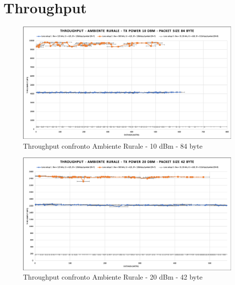 \documentclass[12pt,a4paper,openright,twoside]{report}
\begin{document}
\section{Throughput}
\begin{figure}[h]                      
\begin{center} 
\includegraphics[width=\textwidth]{THROUGHPUT_confronto_AR_10dBm_84byte.png}
\caption[Throughput confronto Ambiente Rurale - 10 dBm - 84 byte]{Throughput confronto Ambiente Rurale - 10 dBm - 84 byte}\label{fig:prima}
\end{center}
\end{figure}

\begin{figure}[h]                      
\begin{center} 
\includegraphics[width=\textwidth]{THROUGHPUT_confronto_AR_20dBm_42byte.png}
\caption[Throughput confronto Ambiente Rurale - 20 dBm - 42 byte]{Throughput confronto Ambiente Rurale - 20 dBm - 42 byte}\label{fig:prima}
\end{center}
\end{figure}
\end{document}
